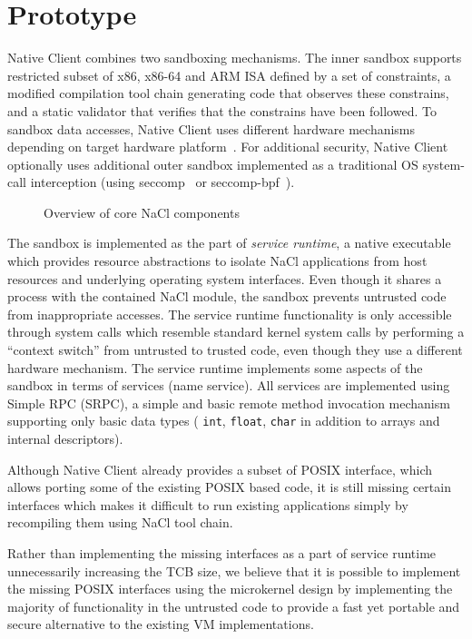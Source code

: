 \section{Prototype}
\label{sec:prototype}

Native Client combines two sandboxing mechanisms. The inner sandbox
supports restricted subset of x86, x86-64 and ARM ISA defined by a set
of constraints, a modified compilation tool chain generating code that
observes these constrains, and a static validator that verifies that
the constrains have been followed. To sandbox data accesses, Native
Client uses different hardware mechanisms depending on target hardware
platform~\cite{yee:ieee-sp09,sehr:usenix-sec10}. For additional
security, Native Client optionally uses additional outer sandbox
implemented as a traditional OS system-call interception (\eg using
seccomp~\cite{seccomp:linux} or
seccomp\mbox{-}bpf~\cite{seccomp-bpf:linux}).

\begin{figure}
\centering
\caption{Overview of core NaCl components}
\label{fig:overview}
\end{figure}

The sandbox is implemented as the part of \emph{service runtime}, a
native executable which provides resource abstractions to isolate NaCl
applications from host resources and underlying operating system
interfaces. Even though it shares a process with the contained NaCl
module, the sandbox prevents untrusted code from inappropriate accesses.
The service runtime functionality is only accessible through system
calls which resemble standard kernel system calls by performing a
``context switch'' from untrusted to trusted code, even though they use
a different hardware mechanism. The service runtime implements some
aspects of the sandbox in terms of services (\eg name service). All
services are implemented using Simple RPC (SRPC), a simple and basic
remote method invocation mechanism supporting only basic data types (\ie
\lstinline`int`, \lstinline`float`, \lstinline`char` in addition to
arrays and internal descriptors).

Although Native Client already provides a subset of POSIX interface,
which allows porting some of the existing POSIX based code, it is still
missing certain interfaces which makes it difficult to run existing
applications simply by recompiling them using NaCl tool chain.

Rather than implementing the missing interfaces as a part of service
runtime unnecessarily increasing the TCB size, we believe that it is
possible to implement the missing POSIX interfaces using the microkernel
design by implementing the majority of functionality in the untrusted
code to provide a fast yet portable and secure alternative to the
existing VM implementations.

